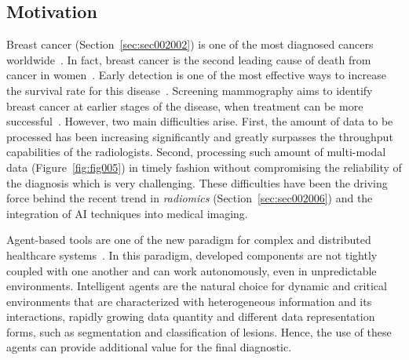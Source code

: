 
\subsection{Motivation}
\label{sec:sec005001001}

Breast cancer (Section~\ref{sec:sec002002}) is one of the most diagnosed cancers worldwide~\cite{desantis2016breast, torre2015global}.
In fact, breast cancer is the second leading cause of death from cancer in women~\cite{doi:10.3322/caac.21492}.
Early detection is one of the most effective ways to increase the survival rate for this disease~\cite{welch2016breast, saadatmand2015influence}.
Screening mammography aims to identify breast cancer at earlier stages of the disease, when treatment can be more successful~\cite{McKinney2020}.
However, two main difficulties arise.
First, the amount of data to be processed has been increasing significantly and greatly surpasses the throughput capabilities of the radiologists.
Second, processing such amount of multi-modal data (Figure~\ref{fig:fig005}) in timely fashion without compromising the reliability of the diagnosis which is very challenging.
These difficulties have been the driving force behind the recent trend in {\it radiomics} (Section~\ref{sec:sec002006}) and the integration of \ac{AI} techniques into medical imaging.

Agent-based tools are one of the new paradigm for complex and distributed healthcare systems~\cite{10.1145/3206505.3206555, esteva2019guide}.
In this paradigm, developed components are not tightly coupled with one another and can work autonomously, even in unpredictable environments.
Intelligent agents are the natural choice for dynamic and critical environments that are characterized with heterogeneous information and its interactions, rapidly growing data quantity and different data representation forms, such as segmentation and classification of lesions.
Hence, the use of these agents can provide additional value for the final diagnostic.

